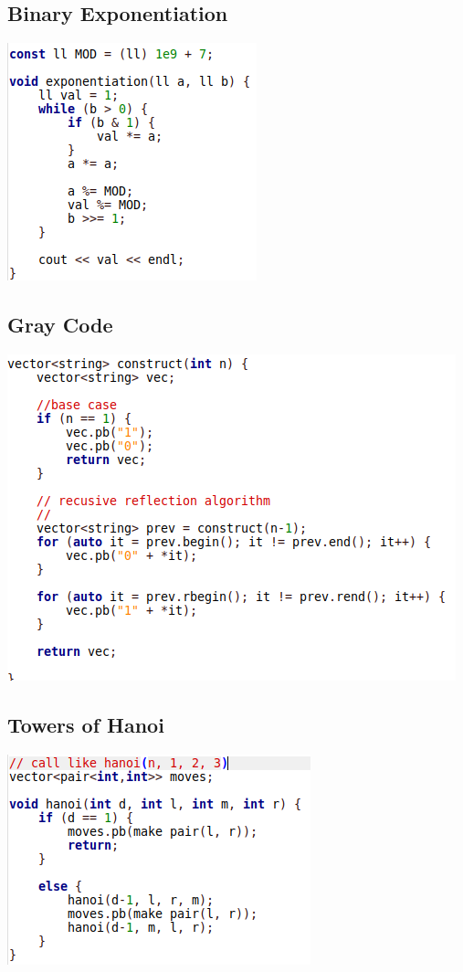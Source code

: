 \documentclass[11pt,twocolumn]{article}
\begin{document}
\subsection{Binary Exponentiation}

\includegraphics[scale=0.5]{binexp}

\subsection{Gray Code}

\includegraphics[scale=0.5]{graycode}

\subsection{Towers of Hanoi}
\includegraphics[scale=0.5]{hanoi}
\end{document}
